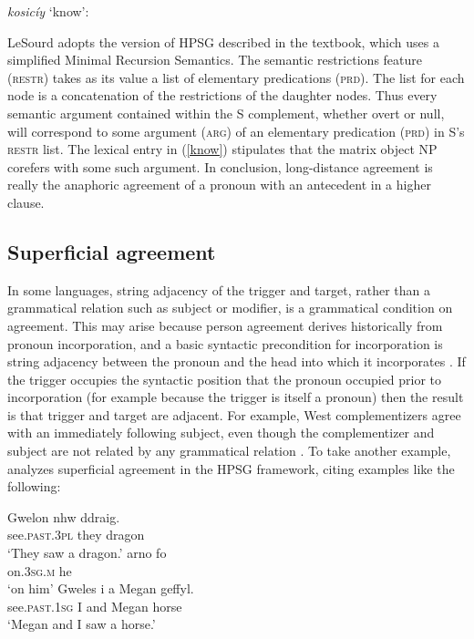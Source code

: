 \documentclass[output=paper
	        ,collection
	        ,collectionchapter
 	        ,biblatex
                ,babelshorthands
                ,newtxmath
                ,draftmode
                ,colorlinks, citecolor=brown
]{langscibook}
\begin{document}
 \begin{exe}
\ex\label{know}
\textit{kosic\'{i}y} `know': \\
\end{exe}

\noindent
LeSourd adopts the version of HPSG described in the \citet{Sag+etal:2003} textbook, which uses a simplified Minimal Recursion Semantics. The semantic restrictions feature (\textsc{restr}) takes as its value a list of elementary predications (\textsc{prd}).  The list for each node is a concatenation of the restrictions of the daughter nodes.  Thus every semantic argument contained within the S complement, whether overt or null, will correspond to some argument (\textsc{arg}) of an elementary predication (\textsc{prd}) in S's \textsc{restr} list.  The lexical entry in (\ref{know}) stipulates that the matrix object NP corefers with some such argument.    In conclusion,  long-distance agreement is really the anaphoric agreement of a pronoun with an antecedent in a higher clause.  


\subsection{Superficial agreement}

 In some languages, string adjacency of the trigger and target, rather than a grammatical relation such as subject or modifier, is a grammatical condition on agreement. This may arise because person agreement derives historically from pronoun incorporation, and a basic syntactic precondition for incorporation is string adjacency between the pronoun and the head into which it incorporates \citep{givon:1976,ariel:1999,wechsler+epps+coppock:2010,fuss:2005}.  If the trigger occupies the syntactic position that the pronoun occupied prior to incorporation (for example because the trigger is itself a pronoun) then the result is that trigger and target are adjacent.  For example, West  complementizers agree with an immediately following subject, even though the complementizer and subject are not related by any grammatical relation \citep{Haegeman:1992}.  To take another example, \citet{Borsley:2009} analyzes  superficial agreement in the HPSG framework, citing examples like the following:

\begin{exe}
\ex \label{welsh}
\begin{xlist}
\ex
\gll 	Gwelon nhw ddraig. \\
see.\textsc{past.3pl} they dragon \\
\glt `They saw a dragon.’
\ex 
\gll 	arno fo \\
on.\textsc{3sg.m} he \\
\glt `on him’
\ex 
\gll 	Gweles i a Megan geffyl. \\
see.\textsc{past.1sg} I and Megan horse \\
\glt `Megan and I saw a horse.’
\end{xlist}
\end{exe}
\end{document}
